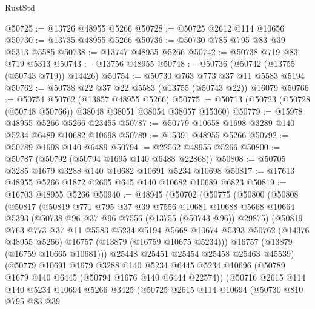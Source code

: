 \begin{lexlean}{RustStd}
\begin{coremodule}
@50725 := @13726 @48955 @5266
@50728 := @50725 @2612 @114 @10656
@50730 := @13735 @48955 @5266
@50736 := @50730 @785 @795 @83 @39 @5313 @5585
@50738 := @13747 @48955 @5266
@50742 := @50738 @719 @83 @719 @5313
@50743 := @13756 @48955
@50748 := @50736 (@50742 (@13755 (@50743 @719)) @14426)
@50754 := @50730 @763 @773 @37 @11 @5583 @5194
@50762 := @50738 @22 @37 @22 @5583 (@13755 (@50743 @22)) @16079
@50766 := @50754 @50762 (@13857 @48955 @5266)
@50775 := @50713 (@50723 (@50728 (@50748 @50766)) @38048 @38051 @38054 @38057 @15360)
@50779 := @15978 @48955 @5266 @5266 @23455
@50787 := @50779 @10658 @1698 @3289 @140 @5234 @6489 @10682 @10698
@50789 := @15391 @48955 @5266
@50792 := @50789 @1698 @140 @6489
@50794 := @22562 @48955 @5266
@50800 := @50787 (@50792 (@50794 @1695 @140 @6488 @22868))
@50808 := @50705 @3285 @1679 @3288 @140 @10682 @10691 @5234 @10698
@50817 := @17613 @48955 @5266 @1872 @2605 @645 @140 @10682 @10689 @6823
@50819 := @16703 @48955 @5266
@50940 := @48945
    (@50702
      (@50775
        (@50800
          (@50808
            (@50817
              (@50819
                @771
                @795
                @37
                @39
                @7556
                @10681
                @10688
                @5668
                @10664
                @5393
                (@50738 @96 @37 @96 @7556 (@13755 (@50743 @96)) @29875)
                (@50819
                  @763
                  @773
                  @37
                  @11
                  @5583
                  @5234
                  @5194
                  @5668
                  @10674
                  @5393
                  @50762
                  (@14376 @48955 @5266)
                  @16757
                  (@13879 (@16759 @10675 @5234)))
                @16757
                (@13879 (@16759 @10665 @10681)))
              @25448
              @25451
              @25454
              @25458
              @25463
              @45539)
            (@50779
              @10691
              @1679
              @3288
              @140
              @5234
              @6445
              @5234
              @10696
              (@50789 @1679 @140 @6445 (@50794 @1676 @140 @6444 @22574))
              (@50716
                @2615
                @114
                @140
                @5234
                @10694
                @5266
                @3425
                (@50725
                  @2615
                  @114
                  @10694
                  (@50730
                    @810
                    @795
                    @83
                    @39

\end{coremodule}
\end{lexlean}
